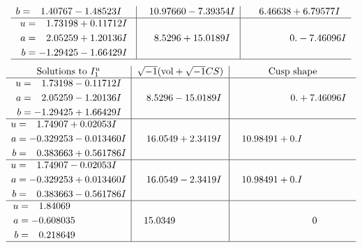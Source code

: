 \documentclass[1p]{elsarticle_modified}
\theoremstyle{definition}
\newcommand{\I}{\sqrt{-1}}
\begin{document}
$$\begin{array}{c|c|c}
\begin{aligned}
b &= \phantom{-}1.40767 - 1.48523 I\end{aligned}
 & \phantom{-}10.97660 - 7.39354 I & \phantom{-}6.46638 + 6.79577 I \\ \hline\begin{aligned}
u &= \phantom{-}1.73198 + 0.11712 I \\
a &= \phantom{-}2.05259 + 1.20136 I \\
b &= -1.29425 - 1.66429 I\end{aligned}
 & \phantom{-}8.5296 + 15.0189 I & \phantom{-0.000000 } 0. - 7.46096 I\\
 \hline 
 \end{array}$$\newpage$$\begin{array}{c|c|c}  
\text{Solutions to }I^u_{1}& \I (\text{vol} + \sqrt{-1}CS) & \text{Cusp shape}\\
 \hline 
\begin{aligned}
u &= \phantom{-}1.73198 - 0.11712 I \\
a &= \phantom{-}2.05259 - 1.20136 I \\
b &= -1.29425 + 1.66429 I\end{aligned}
 & \phantom{-}8.5296 - 15.0189 I & \phantom{-0.000000 -}0. + 7.46096 I \\ \hline\begin{aligned}
u &= \phantom{-}1.74907 + 0.02053 I \\
a &= -0.329253 - 0.013460 I \\
b &= \phantom{-}0.383663 + 0.561786 I\end{aligned}
 & \phantom{-}16.0549 + 2.3419 I & \phantom{-}10.98491 + 0. I\phantom{ +0.000000I} \\ \hline\begin{aligned}
u &= \phantom{-}1.74907 - 0.02053 I \\
a &= -0.329253 + 0.013460 I \\
b &= \phantom{-}0.383663 - 0.561786 I\end{aligned}
 & \phantom{-}16.0549 - 2.3419 I & \phantom{-}10.98491 + 0. I\phantom{ +0.000000I} \\ \hline\begin{aligned}
u &= \phantom{-}1.84069\phantom{ +0.000000I} \\
a &= -0.608035\phantom{ +0.000000I} \\
b &= \phantom{-}0.218649\phantom{ +0.000000I}\end{aligned}
 & \phantom{-}15.0349\phantom{ +0.000000I} & \phantom{-0.000000 } 0\\
 \hline 
 \end{array}$$\newpage\newpage\renewcommand{\arraystretch}{1}
\end{document}
